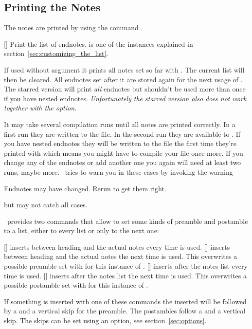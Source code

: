 \documentclass[load-preamble+]{cnltx-doc}
\begin{document}
\subsection{Printing the Notes}
The notes are printed by using the command .
\begin{commands}
  [\sarg{}]
    Print the list of endnotes.  is one of the instances
    explained in section~\ref{sec:customizing_the_list}.
\end{commands}
If used without argument it prints all notes set so far with . The
current list will then be cleared.  All endnotes set after it are stored again
for the next usage of .  The starred version will print
\emph{all} endnotes but shouldn't be used more than once if you have nested
endnotes.  \emph{Unfortunately the starred version also does not work together
  with the  option.}

It may take several compilation runs until all notes are printed correctly.
In a first run they are written to the  file.  In the second run
they are available to .  If you have nested endnotes they
will be written to the  file the first time they're printed with
 which means you might have to compile your file once more.
If you change any of the endnotes or add another one you again will need at
least two runs, maybe more.  \enotez\ tries to warn you in these cases by
invoking the warning
\begin{flushleft}
  \ttfamily
  Endnotes may have changed.  Rerun to get them right.
\end{flushleft}
but may not catch all cases.

\enotez\ provides two commands that allow to set some kinds of preamble and
postamble to a list, either to every list or only to the next one:
\begin{commands}
  []
    inserts  between heading and the actual notes
    every time  is used.
  []
     inserts  between heading and the actual
    notes the next time  is used.  This overwrites a
    possible preamble set with  for this instance of
    .
  []
     inserts  after the notes list every time
     is used.
  []
     inserts  after the notes list the next time
     is used.  This overwrites a possible postamble set with
     for this instance of .
\end{commands}
If something is inserted with one of these commands the inserted 
will be followed by a  and a vertical skip for the preamble.  The
postambles follow a  and a vertical skip.  The skips can be set using
an option, see section~\ref{sec:options}.
\end{document}
